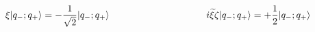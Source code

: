 \begin{equation}
\label{mp}
\xi|q_-;q_+ \rangle=-\frac{1}{\sqrt{2}}|q_-;q_+ \rangle
\hspace{1.4in}
i{\widetilde \xi}\zeta|q_-;q_+ \rangle=+\frac{1}{2}|q_-;q_+ 
\rangle
\end{equation}

